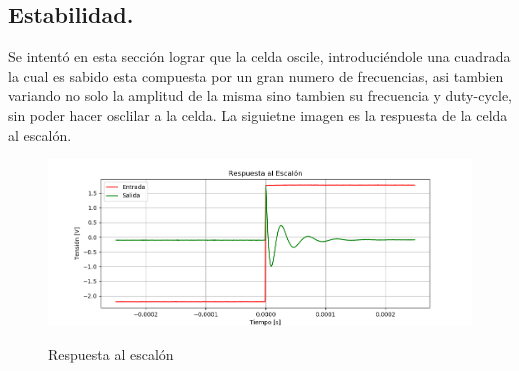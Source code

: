 \subsection{Estabilidad.}
Se intentó en esta sección lograr que la celda oscile, introduciéndole una cuadrada la cual es sabido esta compuesta por un gran numero de frecuencias, asi tambien variando no solo la amplitud de la misma sino tambien su frecuencia y duty-cycle, sin poder hacer osclilar a la celda. La siguietne imagen es la respuesta de la celda al escalón.
\begin{figure}[H]
	\centering
	\includegraphics[width=\textwidth]{Imagenes-Ej3/Step.png}
	\label{fig:stepresponse}
	\caption{Respuesta al escalón}
\end{figure}
%

